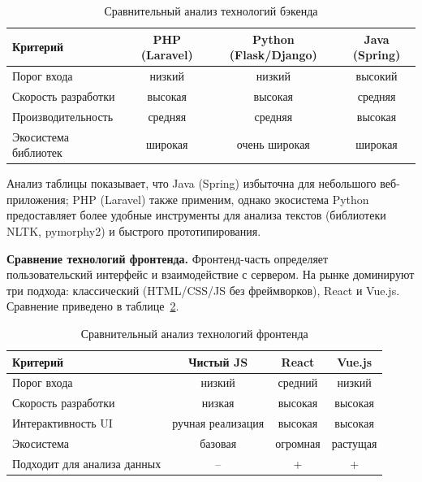 \documentclass[14pt, a4paper]{extarticle}
\begin{document}
\begin{table}[ht!]
	\centering
	\caption{Сравнительный анализ технологий бэкенда}
	\label{tab:backend_comparison}
	\footnotesize
	\begin{tabular}{|p{7.8cm}|c|c|c|}
		\hline
		\textbf{Критерий} & \textbf{PHP (Laravel)} & \textbf{Python (Flask/Django)} & \textbf{Java (Spring)} \\
		\hline
		Порог входа            & низкий         & низкий          & высокий \\
		\hline
		Скорость разработки    & высокая        & высокая         & средняя \\
		\hline
		Производительность     & средняя        & средняя         & высокая \\
		\hline
		Экосистема библиотек   & широкая        & очень широкая   & широкая \\
		\hline
	\end{tabular}
\end{table}

Анализ таблицы показывает, что Java (Spring) избыточна для небольшого
веб-приложения; PHP (Laravel) также применим, однако экосистема
Python предоставляет более удобные инструменты для анализа текстов
(библиотеки NLTK, pymorphy2) и быстрого прототипирования.

\textbf{Сравнение технологий фронтенда.} Фронтенд-часть определяет пользовательский интерфейс и взаимодействие
с сервером. На рынке доминируют три подхода: классический
(HTML/CSS/JS без фреймворков), React и Vue.js. Сравнение приведено
в таблице~\ref{tab:frontend_comparison}.

\begin{table}[ht!]
	\centering
	\caption{Сравнительный анализ технологий фронтенда}
	\label{tab:frontend_comparison}
	\footnotesize
	\begin{tabular}{|p{8.8cm}|c|c|c|}
		\hline
		\textbf{Критерий} & \textbf{Чистый JS} & \textbf{React} & \textbf{Vue.js} \\
		\hline
		Порог входа            & низкий      & средний    & низкий \\
		\hline
		Скорость разработки    & низкая      & высокая    & высокая \\
		\hline
		Интерактивность UI     & ручная реализация & высокая & высокая \\
		\hline
		Экосистема             & базовая     & огромная   & растущая \\
		\hline
		Подходит для анализа данных & – & + & + \\
		\hline
	\end{tabular}
\end{table}
\end{document}
